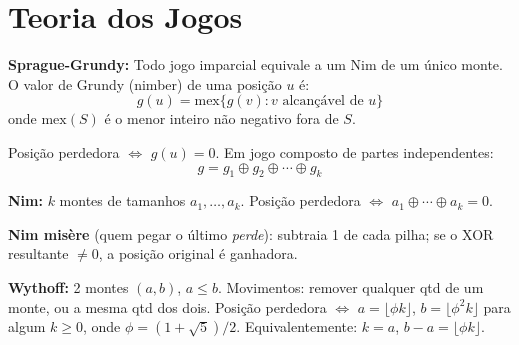\setlength{\parindent}{0pt}

\section{Teoria dos Jogos}

\textbf{Sprague-Grundy:} Todo jogo imparcial equivale a um Nim de um único monte. O valor de Grundy (nimber) de uma posição $u$ é:
\[g(u)=\text{mex}\{g(v): v \text{ alcançável de } u\}\]
onde $\text{mex}(S)$ é o menor inteiro não negativo fora de $S$.

Posição perdedora $\Leftrightarrow$ $g(u)=0$. Em jogo composto de partes independentes:
\[g = g_1 \oplus g_2 \oplus \cdots \oplus g_k\]

\textbf{Nim:} $k$ montes de tamanhos $a_1,\ldots,a_k$. Posição perdedora $\Leftrightarrow$ $a_1\oplus\cdots\oplus a_k=0$.

\textbf{Nim misère} (quem pegar o último \emph{perde}): subtraia 1 de cada pilha; se o XOR resultante $\neq 0$, a posição original é ganhadora.

\textbf{Wythoff:} 2 montes $(a,b)$, $a\leq b$. Movimentos: remover qualquer qtd de um monte, ou a mesma qtd dos dois. Posição perdedora $\Leftrightarrow$ $a=\lfloor\phi k\rfloor$, $b=\lfloor\phi^2 k\rfloor$ para algum $k\geq0$, onde $\phi=(1+\sqrt5)/2$. Equivalentemente: $k=a$, $b-a=\lfloor\phi k\rfloor$.

